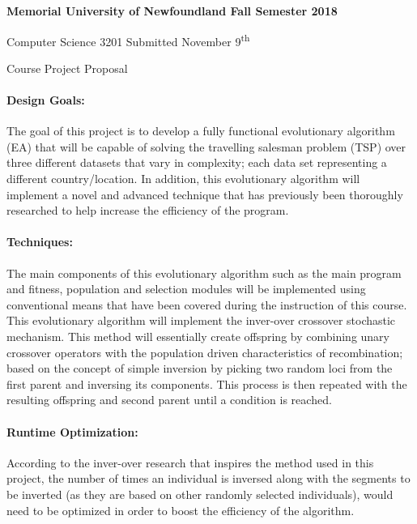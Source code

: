 	{
		\parindent=0pt
		\bfseries
		Memorial University of Newfoundland \hfill Fall Semester 2018 
		
		Computer Science 3201 \hfill Submitted November 9\textsuperscript{th}
		
		\vskip 2pc
		
		{
			\Large \hfill Course Project Proposal \hfill
		}
	}
	
	\paragraph{Design Goals:} The goal of this project is to develop a fully functional evolutionary algorithm (EA) that will be capable of solving the travelling salesman problem (TSP) over three different datasets that vary in complexity; each data set representing a different country/location. In addition, this evolutionary algorithm will implement a novel and advanced technique that has previously been thoroughly researched to help increase the efficiency of the program.
	
	\paragraph{Techniques:} The main components of this evolutionary algorithm such as the main program and fitness, population and selection modules will be implemented using conventional means that have been covered during the instruction of this course. This evolutionary algorithm will implement the inver-over crossover stochastic mechanism. This method will essentially create offspring by combining unary crossover operators with the population driven characteristics of recombination; based on the concept of simple inversion by picking two random loci from the first parent and inversing its components. This process is then repeated with the resulting offspring and second parent until a condition is reached.
	
	\paragraph{Runtime Optimization:} According to the inver-over research that inspires the method used in this project, the number of times an individual is inversed along with the segments to be inverted (as they are based on other randomly selected individuals), would need to be optimized in order to boost the efficiency of the algorithm. 
	
